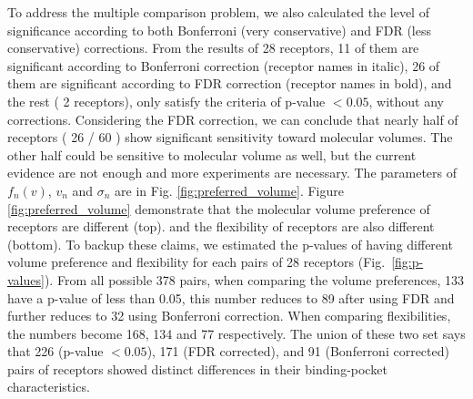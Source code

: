 \documentclass[landscape,a1paper,fontscale=0.6]{baposter} %
\newcommand{\numberofreceptors}{ 28 }
\newcommand{\bonferroni}{ 11 }
\newcommand{\fdr}{ 26 }
\newcommand{\nocorrection}{ 2 }
\begin{document}
\begin{poster}
{To address the multiple comparison problem, 
we also calculated the level of significance according to both Bonferroni (very conservative) and FDR (less conservative) corrections. 
From the results of \numberofreceptors receptors, 
\bonferroni of them are significant according to Bonferroni correction (receptor names in italic), 
\fdr of them are significant according to FDR correction 
(receptor names in bold), 
and the rest (\nocorrection receptors), 
only satisfy the criteria of  p-value $<0.05$, without any corrections.
Considering the FDR correction, 
we can conclude that nearly half of receptors (\fdr / 60 ) show significant sensitivity toward molecular volumes. 
The other half could be sensitive to molecular volume as well, but the current evidence are not enough and
more experiments are necessary.
The parameters of $f_n(v)$, $v_n$ and $\sigma_n$ are in Fig. \ref{fig:preferred_volume}.
Figure \ref{fig:preferred_volume} demonstrate that the molecular volume preference of receptors are different (top). 
and the flexibility of receptors are also different (bottom).
To backup these claims, 
we estimated the p-values of having different volume preference and flexibility for each pairs of \numberofreceptors receptors
(Fig.~\ref{fig:p-values}). 
From all possible 378 pairs, 
when comparing the volume preferences, 
133 have a p-value of less than 0.05, 
this number reduces to 89 after using FDR and further reduces to 32 using Bonferroni correction.
When comparing flexibilities, 
the numbers become 168, 134 and 77 respectively. 
The union of these two set says that 226 (p-value $<0.05$), 171 (FDR corrected), and 91 (Bonferroni corrected) pairs of receptors showed distinct differences in their binding-pocket characteristics.

}
\end{poster}
\end{document}
